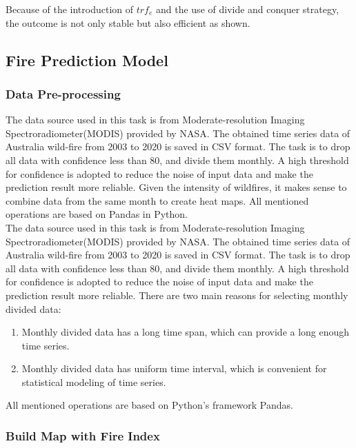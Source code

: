 \documentclass[../main]{subfiles}
\begin{document}
Because of the introduction of \(trf_e\) and the use of divide and
conquer strategy, the outcome is not only stable but also efficient as
shown.

\subsection{Fire Prediction Model}

\hypertarget{data-pre-processing}{%
\subsubsection{Data Pre-processing}\label{data-pre-processing}}

The data source used in this task is from Moderate-resolution Imaging
Spectroradiometer(MODIS) provided by NASA. The obtained time series data
of Australia wild-fire from 2003 to 2020 is saved in CSV format. The
task is to drop all data with confidence less than 80, and divide them
monthly. A high threshold for confidence is adopted to reduce the noise
of input data and make the prediction result more reliable. Given the
intensity of wildfires, it makes sense to combine data from the same
month to create heat maps. All mentioned operations are based on Pandas
in Python.\\
The data source used in this task is from Moderate-resolution Imaging
Spectroradiometer(MODIS) provided by NASA. The obtained time series data
of Australia wild-fire from 2003 to 2020 is saved in CSV format. The
task is to drop all data with confidence less than 80, and divide them
monthly. A high threshold for confidence is adopted to reduce the noise
of input data and make the prediction result more reliable. There are
two main reasons for selecting monthly divided data:

\begin{enumerate}
\def\labelenumi{\arabic{enumi}.}
\item
  Monthly divided data has a long time span, which can provide a long
  enough time series.
\item
  Monthly divided data has uniform time interval, which is convenient
  for statistical modeling of time series.
\end{enumerate}

All mentioned operations are based on Python's framework Pandas.

\hypertarget{build-map-with-fire-index}{%
\subsubsection{Build Map with Fire
Index}\label{build-map-with-fire-index}}
\end{document}
